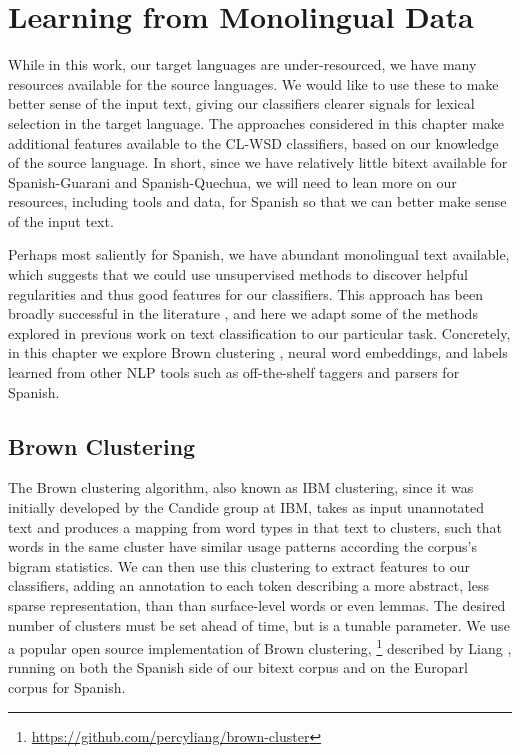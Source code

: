 \chapter{Learning from Monolingual Data}
\label{chap:monolingual}
While in this work, our target languages are under-resourced, we have many
resources available for the source languages. We would like to use these to
make better sense of the input text, giving our classifiers clearer signals for
lexical selection in the target language.
The approaches considered in this chapter make additional features available to
the CL-WSD classifiers, based on our knowledge of the source language.
In short, since we have relatively little bitext available for Spanish-Guarani
and Spanish-Quechua, we will need to lean more on our resources, including
tools and data, for Spanish so that we can better make sense of the input text.

Perhaps most saliently for Spanish, we have abundant monolingual text
available, which suggests that we could use unsupervised methods to discover
helpful regularities and thus good features for our classifiers. This approach
has been broadly successful in the literature
\cite{turian-ratinov-bengio:2010:ACL}
, and here we adapt some of the methods explored in previous work on text
classification to our particular task. Concretely, in this chapter we explore
Brown clustering \cite{brown1992class}, neural word embeddings, and labels
learned from other NLP tools such as off-the-shelf taggers and parsers for
Spanish.


\section{Brown Clustering}
The Brown clustering algorithm, also known as IBM clustering, since it was
initially developed by the Candide group at IBM, takes as input unannotated
text and produces a mapping from word types in that text to clusters, such that
words in the same cluster have similar usage patterns according the corpus's
bigram statistics.
We can then use this clustering to extract features to our classifiers, adding
an annotation to each token describing a more abstract, less sparse
representation, than than surface-level words or even lemmas.
The desired number of clusters must be set ahead of time, but is a tunable
parameter.
We use a popular open source implementation of Brown clustering,
\footnote{\url{https://github.com/percyliang/brown-cluster}} described by
Liang \cite{Liang05semi-supervisedlearning}, running on both the Spanish
side of our bitext corpus and on the Europarl corpus \cite{europarl} for
Spanish.

